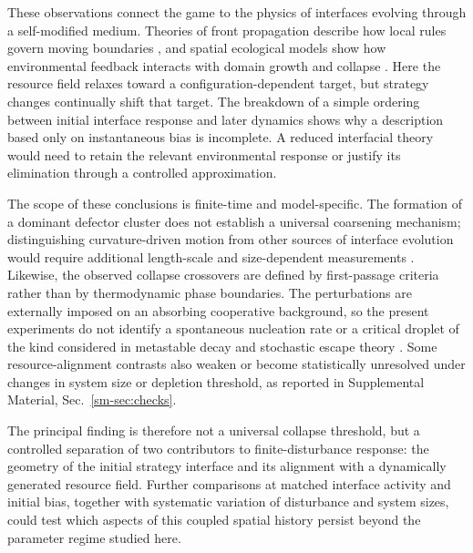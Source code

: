 These observations connect the game to the physics of interfaces evolving through a self-modified medium. Theories of front propagation describe how local rules govern moving boundaries \cite{vansaarloos2003fronts}, and spatial ecological models show how environmental feedback interacts with domain growth and collapse \cite{bel2012gradual,rietkerk2021tipping}. Here the resource field relaxes toward a configuration-dependent target, but strategy changes continually shift that target. The breakdown of a simple ordering between initial interface response and later dynamics shows why a description based only on instantaneous bias is incomplete. A reduced interfacial theory would need to retain the relevant environmental response or justify its elimination through a controlled approximation.

The scope of these conclusions is finite-time and model-specific. The formation of a dominant defector cluster does not establish a universal coarsening mechanism; distinguishing curvature-driven motion from other sources of interface evolution would require additional length-scale and size-dependent measurements \cite{bray1994ordering,dornic2001coarsening}. Likewise, the observed collapse crossovers are defined by first-passage criteria rather than by thermodynamic phase boundaries. The perturbations are externally imposed on an absorbing cooperative background, so the present experiments do not identify a spontaneous nucleation rate or a critical droplet of the kind considered in metastable decay and stochastic escape theory \cite{langer1969decay,assaf2017wkb}. Some resource-alignment contrasts also weaken or become statistically unresolved under changes in system size or depletion threshold, as reported in Supplemental Material, Sec.~\ref{sm-sec:checks}.

The principal finding is therefore not a universal collapse threshold, but a controlled separation of two contributors to finite-disturbance response: the geometry of the initial strategy interface and its alignment with a dynamically generated resource field. Further comparisons at matched interface activity and initial bias, together with systematic variation of disturbance and system sizes, could test which aspects of this coupled spatial history persist beyond the parameter regime studied here.
